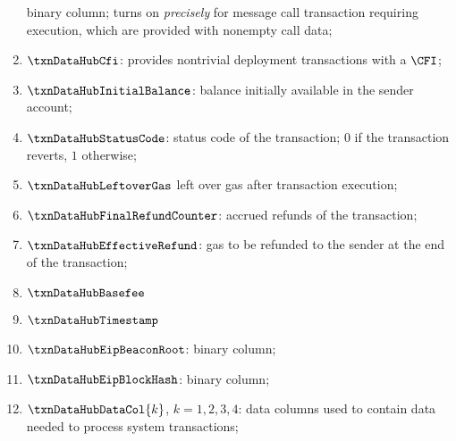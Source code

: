 \begin{enumerate}
		binary column;
		turns on \emph{precisely}
		for message call transaction
		requiring \evm{} execution,
		which are provided with nonempty call data;
	\item
		\markAsExtractedFromHub{}
		$\txnDataHubCfi$:
		provides nontrivial deployment transactions with a $\CFI$;
	\item
		\markAsExtractedFromHub{}
		$\txnDataHubInitialBalance$:
		balance initially available in the sender account;
	\item
		\markAsExtractedFromHub{}
		$\txnDataHubStatusCode$:
		status code of the transaction;
		$0$ if the transaction reverts,
		$1$ otherwise;
	\item
		\markAsExtractedFromHub{}
		$\txnDataHubLeftoverGas$
		left over gas after transaction execution;
	\item
		\markAsExtractedFromHub{}
		$\txnDataHubFinalRefundCounter$:
		accrued refunds of the transaction;
	\item
		\markAsJustifiedHere{}
		$\txnDataHubEffectiveRefund$:
		gas to be refunded to the sender at the end of the transaction;
	\item
		\markAsExtractedFromBtc{}
		$\txnDataHubBasefee$
	\item
		\markAsExtractedFromBtc{}
		$\txnDataHubTimestamp$
	\item
		$\txnDataHubEipBeaconRoot$:
		binary column;
	\item
		$\txnDataHubEipBlockHash$:
		binary column;
	\item
		$\txnDataHubDataCol{k}$,
		$k = 1, 2, 3, 4$:
		data columns used to contain data needed to process system transactions;
\end{enumerate}

